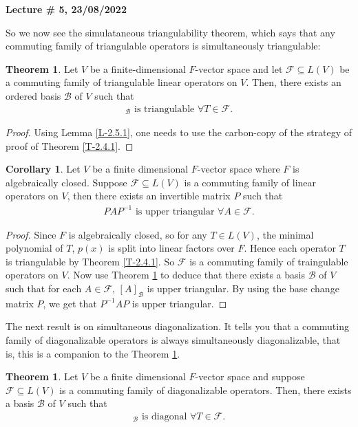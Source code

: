 \documentclass[letterpaper,11pt,twoside]{article}
\theoremstyle{definition}
\theoremstyle{definition}
\newtheorem{theorem}[proposition]{Theorem}
\theoremstyle{definition}
\theoremstyle{definition}
\theoremstyle{definition}
\theoremstyle{definition}
\theoremstyle{remark}
\theoremstyle{definition}
\newtheorem{corollary}[proposition]{Corollary}
\newcommand{\newlecture}[2]{\begin{center}
    \textbf{Lecture \# #1, #2}
\end{center}}
\begin{document}
 \newlecture{5}{23/08/2022}    
 So we now see the simulataneous triangulability theorem, which says that any commuting family of triangulable operators is simultaneously triangulable:
 \begin{theorem}\label{T-2.5.2}
    Let $V$ be a finite-dimensional $F$-vector space and let $\mathcal{F}\subseteq L(V)$ be a commuting family of triangulable linear operators on $V$. Then, there exists an ordered basis $\mathcal{B}$ of $V$ such that
    \begin{align*}
        [T]_\mathcal{B} \text{ is triangulable }\forall T\in \mathcal{F}. 
    \end{align*}
 \end{theorem}
    \begin{proof}
    Using Lemma \ref{L-2.5.1}, one needs to use the carbon-copy of the strategy of proof of Theorem \ref{T-2.4.1}.    \end{proof}
    \begin{corollary}
    Let $V$ be a finite dimensional $F$-vector space where $F$ is algebraically closed. Suppose $\mathcal{F}\subseteq L(V)$ is a commuting family of linear operators on $V$, then there exists an invertible matrix $P$ such that
    \begin{align*}
        PAP^{-1}\text{ is upper triangular }\forall A\in \mathcal{F}.
    \end{align*}
    \end{corollary}
    \begin{proof}
    Since $F$ is algebraically closed, so for any $T\in L(V)$, the minimal polynomial of $T$, $p(x)$ is split into linear factors over $F$. Hence each operator $T$ is triangulable by Theorem \ref{T-2.4.1}. So $\mathcal{F}$ is a commuting family of traingulable operators on $V$. Now use Theorem \ref{T-2.5.2} to deduce that there exists a basis $\mathcal{B}$ of $V$ such that for each $A\in \mathcal{F}$, $[A]_\mathcal{B}$ is upper triangular. By using the base change matrix $P$, we get that $P^{-1}AP$ is upper triangular.
    \end{proof}
    The next result is on simultaneous diagonalization. It tells you that a commuting family of diagonalizable operators is always simultaneously diagonalizable, that is, this is a companion to the Theorem \ref{T-2.5.2}.
    \begin{theorem}
    Let $V$ be a finite dimensional $F$-vector space and suppose $\mathcal{F}\subseteq L(V)$ is a commuting family of diagonalizable operators. Then, there exists a basis $\mathcal{B}$ of $V$ such that 
    \begin{align*}
        [T]_\mathcal{B} \text{ is diagonal }\forall T\in \mathcal{F}.
    \end{align*}
    \end{theorem}
\end{document}
